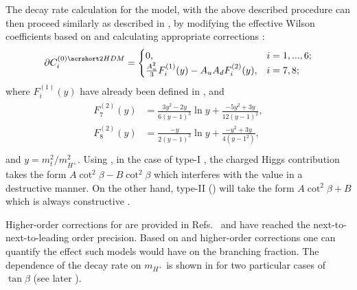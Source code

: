 The decay rate calculation for the \TwoHDM model, with the above described procedure can then proceed similarly as described in , by modifying the effective Wilson coefficients based on  and calculating appropriate corrections \cite{Ciuchini:1997xe}:
\begin{equation}\label{eq:partial_wilson_2hdm}
    \partial C_i^{(0)\TwoHDM} = 
    \begin{cases}
        0, & i=1,...,6;\\
        \frac{A_u^2}{3}F_i^{(1)}(y) - A_uA_dF_i^{(2)}(y), & i=7,8;\\
    \end{cases}
\end{equation}
where $F_i^{(1)}(y)$ have already been defined in , and
\begin{align}
    \begin{split}
    F_7^{(2)}(y) &= \frac{3y^2-2y}{6(y-1)^3}\ln y + \frac{-5y^2+3y}{12(y-1)^2},\\
    F_8^{(2)}(y) &= \frac{-y}{2(y-1)^3}\ln y + \frac{-y^2+3y}{4(y-1^2)},\\
    \end{split}
\end{align}
and $y = m_t^2/m_{H^+}^2$.
Using , in the case of type-I \TwoHDM, the charged Higgs contribution takes the form $A\cot^2\beta-B\cot^2\beta$ which interferes with the \SM value in a destructive manner.
On the other hand, type-II \TwoHDM () will take the form $A\cot^2\beta+B$ which is always constructive \cite{Misiak:2017bgg}.

Higher-order corrections for \TwoHDM are provided in Refs.~\cite{Ciuchini:1997xe,Hermann:2012fc} and have reached the next-to-next-to-leading order precision.
Based on  and higher-order corrections one can quantify the effect such models would have on the \BtoXsgamma branching fraction.
The dependence of the \BtoXsgamma decay rate on $m_{H^+}$ is shown in  for two particular cases of $\tan\beta$ (see later ).

